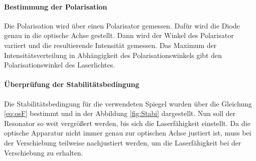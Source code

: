 \paragraph{Bestimmung der Polarisation}
Die Polarisation wird über einen Polarisator gemessen. Dafür wird die Diode genau in die optische Achse 
gestellt. Dann wird der Winkel des Polarisator variiert und die resultierende Intensität gemessen. 
Das Maximum der Intensitätsverteilung in Abhängigkeit des Polarisationswinkels gibt den 
Polarisationswinkel des Laserlichtes. 
\paragraph{Überprüfung der Stabilitätsbedingung}
Die Stabilitätsbedingung für die verwendeten Spiegel wurden über die Gleichung \eqref{eq:osF} bestimmt 
und in der Abbildung \ref{fig:Stabi} dargestellt. Nun soll der Resonator so weit vergrößert werden, 
bis sich die Laserfähigkeit einstellt. Da die optische Apparatur nicht immer genau zur optischen 
Achse justiert ist, muss bei der Verschiebung teilweise nachjustiert werden, um die Laserfähigkeit 
bei der Verschiebung zu erhalten.  
\FloatBarrier
